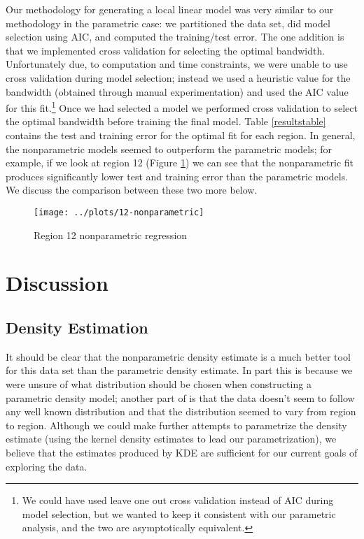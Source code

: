 \documentclass[12pt]{article}
\begin{document}
Our methodology for generating a local linear model was very similar to our methodology in the parametric case: we partitioned the data set, did model selection using AIC, and computed the training/test error. The one addition is that we implemented cross validation for selecting the optimal bandwidth. Unfortunately due, to computation and time constraints, we were unable to use cross validation during model selection; instead we used a heuristic value for the bandwidth (obtained through manual experimentation) and used the AIC value for this fit.\footnote{We could have used leave one out cross validation instead of AIC during model selection, but we wanted to keep it consistent with our parametric analysis, and the two are asymptotically equivalent.} Once we had selected a model we performed cross validation to select the optimal bandwidth before training the final model. Table \ref{resultstable} contains the test and training error for the optimal fit for each region. In general, the nonparametric models seemed to outperform the parametric models; for example, if we look at region 12 (Figure \ref{region12nonparametric}) we can see that the nonparametric fit produces significantly lower test and training error than the parametric models. We discuss the comparison between these two more below.
\begin{figure}[!ht]
\centering
\texttt{[image: ../plots/12-nonparametric]}
\caption{Region 12 nonparametric regression}
\label{region12nonparametric}
\end{figure}
\section{Discussion}
\subsection{Density Estimation}
It should be clear that the nonparametric density estimate is a much better tool for this data set than the parametric density estimate. In part this is because we were unsure of what distribution should be chosen when constructing a parametric density model; another part of is that the data doesn't seem to follow any well known distribution and that the distribution seemed to vary from region to region. Although we could make further attempts to parametrize the density estimate (using the kernel density estimates to lead our parametrization), we believe that the estimates produced by KDE are sufficient for our current goals of exploring the data.
\end{document}
